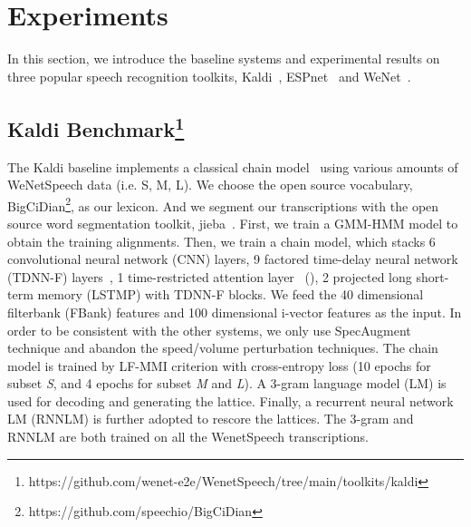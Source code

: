 \documentclass{article}
\begin{document}
\vspace{-0.8em}
\section{Experiments}\label{sec:exp}
\vspace{-1em}
In this section, we introduce the baseline systems and experimental results on three popular speech recognition toolkits, Kaldi~\cite{povey2011kaldi}, ESPnet~\cite{watanabe2018espnet} and WeNet~\cite{yao2021wenet}.

\vspace{-1em}
\subsection[Kaldi Benchmark]{Kaldi Benchmark\footnote{https://github.com/wenet-e2e/WenetSpeech/tree/main/toolkits/kaldi}}
\vspace{-0.5em}
The Kaldi baseline implements a classical chain model~\cite{povey2016purely} using various amounts of WeNetSpeech data (i.e. S, M, L). We choose the open source vocabulary, BigCiDian\footnote{https://github.com/speechio/BigCiDian}, as our lexicon. And we segment our transcriptions with the open source word segmentation toolkit, jieba~\cite{sun2012jieba}. First, we train a GMM-HMM model to obtain the training alignments. Then, we train a chain model, which stacks 6 convolutional neural network (CNN) layers, 9 factored time-delay neural network (TDNN-F) layers~\cite{povey2018semi}, 1 time-restricted attention layer~\cite{povey2018time} (), 2 projected long short-term memory (LSTMP) with TDNN-F blocks. We feed the 40 dimensional filterbank (FBank) features and 100 dimensional i-vector features as the input. In order to be consistent with the other systems, we only use SpecAugment~\cite{park2019specaugment} technique and abandon the speed/volume perturbation techniques. The chain model is trained by LF-MMI criterion with cross-entropy loss (10 epochs for subset \textit{S}, and 4 epochs for subset \textit{M} and \textit{L}). A 3-gram language model (LM) is used for decoding and generating the lattice. Finally, a recurrent neural network LM (RNNLM) is further adopted to rescore the lattices. The 3-gram and RNNLM are both trained on all the WenetSpeech transcriptions.

\vspace{-1em}
\end{document}
